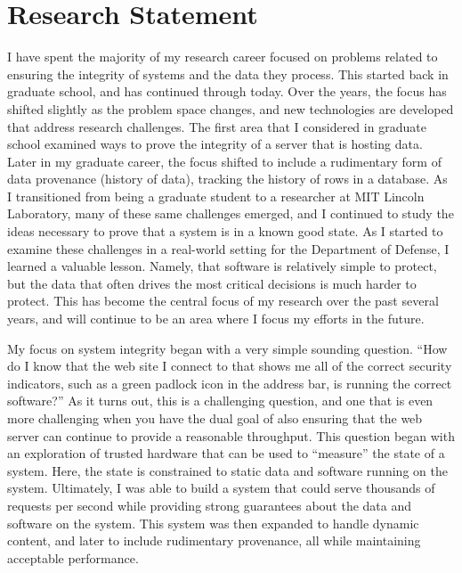 \clearpage
\hypertarget{research-statement}{%
\section{Research Statement}\label{research-statement}}


I have spent the majority of my research career focused on problems related to ensuring the integrity of systems and the data they process. This started back in graduate school, and has continued through today. Over the years, the focus has shifted slightly as the problem space changes, and new technologies are developed that address research challenges. The first area that I considered in graduate school examined ways to prove the integrity of a server that is hosting data. Later in my graduate career, the focus shifted to include a rudimentary form of data provenance (history of data), tracking the history of rows in a database. As I transitioned from being a graduate student to a researcher at MIT Lincoln Laboratory, many of these same challenges emerged, and I continued to study the ideas necessary to prove that a system is in a known good state. As I started to examine these challenges in a real-world setting for the Department of Defense, I learned a valuable lesson. Namely, that software is relatively simple to protect, but the data that often drives the most critical decisions is much harder to protect. This has become the central focus of my research over the past several years, and will continue to be an area where I focus my efforts in the future.

My focus on system integrity began with a very simple sounding question. ``How do I know that the web site I connect to that shows me all of the correct security indicators, such as a green padlock icon in the address bar, is running the correct software?'' As it turns out, this is a challenging question, and one that is even more challenging when you have the dual goal of also ensuring that the web server can continue to provide a reasonable throughput. This question began with an exploration of trusted hardware that can be used to ``measure'' the state of a system. Here, the state is constrained to static data and software running on the system. Ultimately, I was able to build a system that could serve thousands of requests per second while providing strong guarantees about the data and software on the system. This system was then expanded to handle dynamic content, and later to include rudimentary provenance, all while maintaining acceptable performance. 

